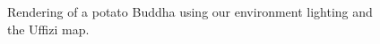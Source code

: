 \begin{figure}
{}
\caption{Rendering of a potato Buddha using our environment lighting and the Uffizi map.}
\label{fig:pathBuddhaenv}
\end{figure}

